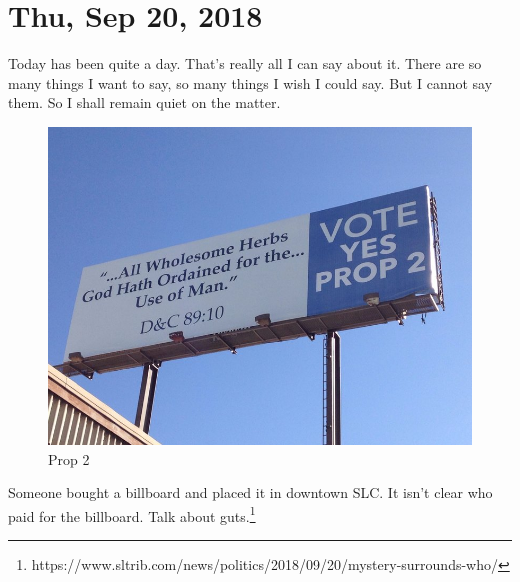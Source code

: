 \section{Thu, Sep 20, 2018}

Today has been quite a day. That's really all I can say about it. There are so many
things I want to say, so many things I wish I could say. But I cannot say them. So I
shall remain quiet on the matter.

\begin{figure}[h!]
  \centering
  \includegraphics[width=1\linewidth]{2018/images/prop2.jpg}
  \caption{Prop 2}
  \label{fig:prop2}
\end{figure}

Someone bought a billboard and placed it in downtown SLC. It isn't clear who paid for
the billboard. Talk about guts.\footnote{
https://www.sltrib.com/news/politics/2018/09/20/mystery-surrounds-who/}
